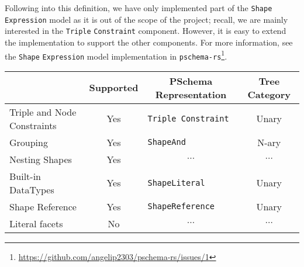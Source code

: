Following into this definition, we have only implemented part of the \texttt{Shape} \texttt{Expression} model as it is out of the scope of the project; recall, we are mainly interested in the \texttt{Triple} \texttt{Constraint} component. However, it is easy to extend the implementation to support the other components. For more information, see the \texttt{Shape} \texttt{Expression} model implementation in \texttt{pschema-rs}\footnote{\url{https://github.com/angelip2303/pschema-rs/issues/1}}.

\begin{table}[ht]
    \centering
    \begin{tabular}{|l|c|l|c|}
        \hline
        \rowcolor[HTML]{EFEFEF}
        \multicolumn{1}{|c|}{\cellcolor[HTML]{EFEFEF}\textbf{Feature}} & \textbf{Supported}         & \multicolumn{1}{c|}{\cellcolor[HTML]{EFEFEF}\textbf{PSchema Representation}} & \multicolumn{1}{c|}{\cellcolor[HTML]{EFEFEF}\textbf{Tree Category}} \\ \hline
        Triple and Node Constraints                                    & {\color[HTML]{009901} Yes} & \texttt{Triple Constraint}                                                   & Unary                                                               \\ \hline
        Grouping                                                       & {\color[HTML]{009901} Yes} & \texttt{ShapeAnd}                                                            & N-ary                                                               \\ \hline
        Nesting Shapes                                                 & {\color[HTML]{009901} Yes} & \multicolumn{1}{c|}{$\cdots$}                                                & \multicolumn{1}{c|}{$\cdots$}                                       \\ \hline
        Built-in DataTypes                                             & {\color[HTML]{009901} Yes} & \texttt{ShapeLiteral}                                                        & Unary                                                               \\ \hline
        Shape Reference                                                & {\color[HTML]{009901} Yes} & \texttt{ShapeReference}                                                      & Unary                                                               \\ \hline
        Literal facets                                                 & {\color[HTML]{FE0000} No}  & \multicolumn{1}{c|}{$\cdots$}                                                & \multicolumn{1}{c|}{$\cdots$}                                       \\ \hline

\end{tabular}
\end{table}

